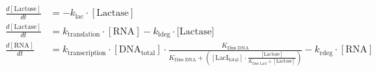 \documentclass{article}
\begin{document}
\begin{align*}
    \frac{d[\text{Lactose}]}{dt}&=-k_\text{lac}\cdot [\text{Lactase}] \\
    \frac{d[\text{Lactase}]}{dt}&=k_\text{translation}\cdot[\text{RNA}]-k_\text{ldeg}\cdot [\text{Lactase]}\\
    \frac{d[\text{RNA}]}{dt}&=k_\text{transcription}\cdot[\text{DNA}_\text{total}]\cdot\frac{K_\text{Diss DNA}}{K_\text{Diss DNA}+([\text{LacI}_\text{total}]\cdot\frac{[\text{Lactose}]}{K_\text{Diss LacI}+[\text{Lactose}]})}-k_\text{rdeg}\cdot[\text{RNA}]
\end{align*}

\printbibliography[title=References]
\end{document}

